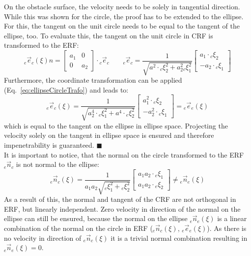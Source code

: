 On the obstacle surface, the velocity needs to be solely in tangential direction. While this was shown for the circle, the proof has to be extended to the ellipse. For this, the tangent on the unit circle needs to be equal to the tangent of the ellipse, too. To evaluate this, the tangent on the unit circle in CRF is transformed to the ERF:
\begin{equation}
  {}_e \vec{e}_{c} (\xi) n= \begin{bmatrix} a_1 & 0 \\ 0 & a_2\end{bmatrix} \cdot {}_c \vec{e}_{c}
   \qquad
   {}_e \vec{e}_{c} = \frac{1}{\sqrt{a^2 \cdot {}_c\xi_2^2 + a_2^2 {}_c\xi_1^2}}
  \begin{bmatrix}
       a_1 \cdot {}_c\xi_2 \\
     - a_2 \cdot {}_c\xi_1
   \end{bmatrix}
\end{equation}
Furthermore, the coordinate transformation can be applied (Eq.~\ref{eq:ellipseCircleTrafo}) and leads to:
\begin{equation}
  {}_e \vec{e}_{c} (\xi) =
  \frac{1}{\sqrt{a_2^4 \cdot {}_e\xi_1^2 + a^4 \cdot{}_e \xi_2^2}}
  \begin{bmatrix}
    a_1^2 \cdot {}_e\xi_2 \\
    - a_2^2 \cdot {}_e\xi_1
  \end{bmatrix}
   =
    {}_e \vec{e}_{e} (\xi)
\end{equation}
which is equal to the tangent on the ellipse in ellipse space. Projecting the velocity solely on the tangent in ellipse space is ensured and therefore impenetrability is guaranteed. \hfill $\blacksquare$ \\

It is important to notice, that the normal on the circle transformed to the ERF ${}_e \vec n_{c} $ is not normal to the ellipse:
\begin{equation}
  {}_e\vec n_{c} (\xi)
  =
  \frac{1}{a_1 a_2\sqrt{ {}_e\xi_1^2 + {}_e \xi_2^2}}
  \begin{bmatrix}
     a_1 a_2 \cdot{}_e\xi_1 \\
     a_1 a_2 \cdot {}_e\xi_2
   \end{bmatrix}
  \neq
  {}_e\vec n_{e} (\xi)
\end{equation}
As a result of this, the normal and tangent of the CRF are not orthogonal in ERF, but linearly independent. Zero velocity in direction of the normal on the ellipse can still be ensured, because the normal on the ellipse ${}_e \vec n_{e} (\xi)$ is a linear combination of the normal on the circle in ERF (${}_e \vec n_{c} (\xi)$, ${}_e \vec e_{e}(\xi)$). As there is no velocity in direction of ${}_e \vec n_{c} (\xi) $ it is a trivial normal combination resulting in ${}_e \vec n_{e} (\xi)= 0$.




